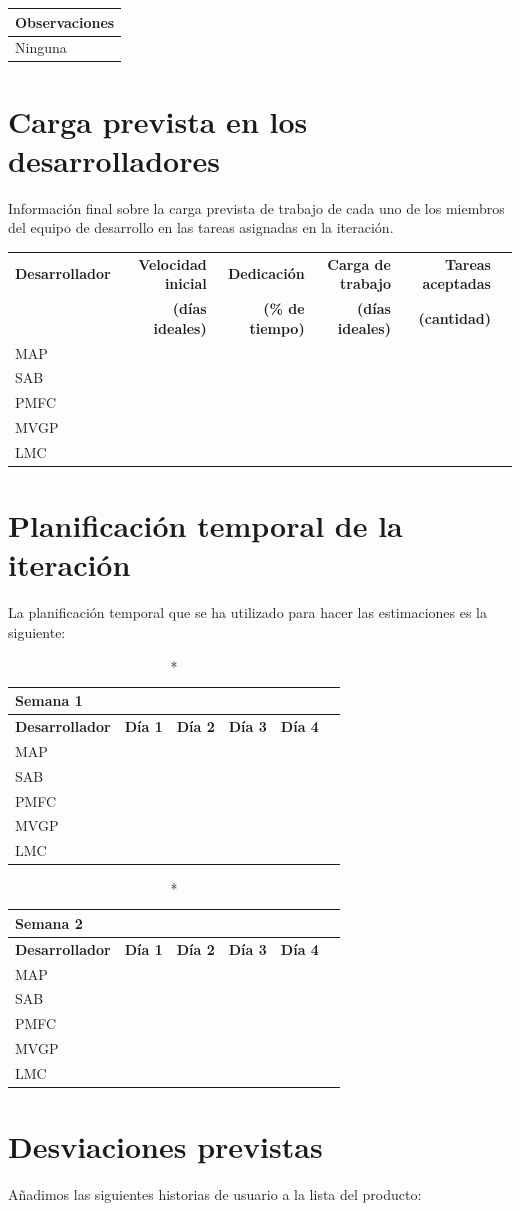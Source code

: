 \documentclass[11pt]{article}
\begin{document}
\begin{longtable}{p{1.028\linewidth}}
	\textbf{Observaciones}\\
	\midrule
	Ninguna\\
	\bottomrule
	\bottomrule
\end{longtable}


\section{Carga prevista en los desarrolladores}

Información final sobre la carga prevista de trabajo de cada uno de los miembros del equipo de desarrollo en las tareas asignadas en la iteración.

\begin{longtable}{lrrrrr}
  \toprule
  \textbf{Desarrollador} & \textbf{Velocidad inicial} & \textbf{Dedicación} & \textbf{Carga de trabajo} & \textbf{Tareas aceptadas} \\
  & \textbf{(días ideales)} & \textbf{(\% de tiempo)} & \textbf{(días ideales)} & \textbf{ (cantidad)}\\
  \midrule
  MAP &  & \\
  SAB &  & \\
  PMFC \\
  MVGP & & \\
  LMC \\
  \bottomrule
\end{longtable}

\section{Planificación temporal de la iteración}
La planificación temporal que se ha utilizado para hacer las estimaciones es la siguiente:


\begin{longtable}{lrrrrr}
  \caption*{Semana 1}\\
  \toprule
  \textbf{Desarrollador} & \textbf{Día 1} & \textbf{Día 2} & \textbf{Día 3} & \textbf{Día 4} \\
  \midrule
  MAP &  & \\
  SAB &  & \\
  PMFC \\
  MVGP & & \\
  LMC \\
  \bottomrule
\end{longtable}

\begin{longtable}{lrrrrr}
  \caption*{Semana 2}\\
  \toprule
  \textbf{Desarrollador} & \textbf{Día 1} & \textbf{Día 2} & \textbf{Día 3} & \textbf{Día 4} \\
  \midrule
  MAP &  & \\
  SAB &  & \\
  PMFC \\
  MVGP & & \\
  LMC \\
  \bottomrule
\end{longtable}

\section{Desviaciones previstas}

Añadimos las siguientes historias de usuario a la lista del producto:
\end{document}
